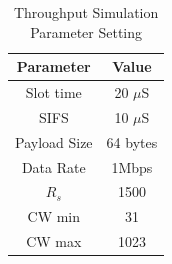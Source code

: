\begin{table}
\caption{Throughput Simulation Parameter Setting}
\label{table:throughput}
\centering
\begin{tabular}{|c||c|}
\hline
Parameter & Value \\  
\hline
 Slot time & 20 $\mu$S \\ 
 \hline
 SIFS & 10 $\mu$S \\
 \hline
 Payload Size & 64 bytes\\ 
\hline
Data Rate & 1Mbps \\
\hline
$R_s$ & 1500 \\
\hline 
CW min & 31 \\
\hline
CW max & 1023 \\
\hline 
\end{tabular}
\end{table}